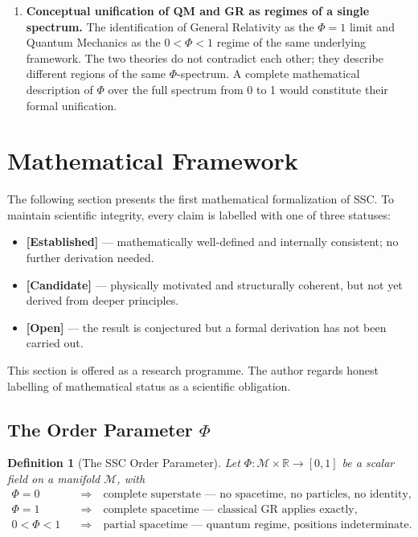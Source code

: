 \documentclass[12pt,a4paper]{article}
\newtheorem{definition}{Definition}
\begin{document}
\begin{enumerate}
  \item \textbf{Conceptual unification of QM and GR as regimes of a
        single spectrum.}  The identification of General Relativity as
        the $\Phi = 1$ limit and Quantum Mechanics as the
        $0 < \Phi < 1$ regime of the same underlying framework.  The
        two theories do not contradict each other; they describe
        different regions of the same $\Phi$-spectrum.  A complete
        mathematical description of $\Phi$ over the full spectrum from
        0 to 1 would constitute their formal unification.
\end{enumerate}

\section{Mathematical Framework}
\label{sec:math}

The following section presents the first mathematical formalization
of SSC. To maintain scientific integrity, every claim is labelled
with one of three statuses:

\begin{itemize}[noitemsep]
  \item \textbf{[Established]} — mathematically well-defined and
        internally consistent; no further derivation needed.
  \item \textbf{[Candidate]} — physically motivated and structurally
        coherent, but not yet derived from deeper principles.
  \item \textbf{[Open]} — the result is conjectured but a formal
        derivation has not been carried out.
\end{itemize}

This section is offered as a research programme. The author regards
honest labelling of mathematical status as a scientific obligation.

\subsection{The Order Parameter \texorpdfstring{$\Phi$}{Phi}}

\begin{definition}[The SSC Order Parameter]
\label{def:phi}
Let $\Phi : \mathcal{M} \times \mathbb{R} \to [0,1]$ be a scalar
field on a manifold $\mathcal{M}$, with
\begin{align*}
  \Phi = 0 &\quad \Longrightarrow \quad
    \text{complete superstate — no spacetime, no particles, no identity,}\\
  \Phi = 1 &\quad \Longrightarrow \quad
    \text{complete spacetime — classical GR applies exactly,}\\
  0 < \Phi < 1 &\quad \Longrightarrow \quad
    \text{partial spacetime — quantum regime, positions indeterminate.}
\end{align*}
\end{definition}
\end{document}
